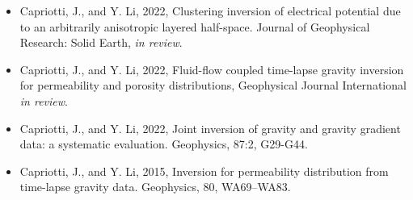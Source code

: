 


\cvparagraph
\begin{itemize}
\item Capriotti, J., and Y. Li, 2022, Clustering inversion of electrical potential due to an arbitrarily anisotropic layered half-space. Journal of Geophysical Research: Solid Earth, \textit{in review}.
\item Capriotti, J., and Y. Li, 2022, Fluid-flow coupled time-lapse gravity inversion for permeability and porosity distributions, Geophysical Journal International \textit{in review}.
\item Capriotti, J., and Y. Li, 2022, Joint inversion of gravity and gravity gradient data: a systematic evaluation. Geophysics, 87:2, G29-G44.
\item Capriotti, J., and Y. Li, 2015, Inversion for permeability distribution from time-lapse gravity data. Geophysics, 80, WA69–WA83.
\end{itemize}
\clearpage
{}
